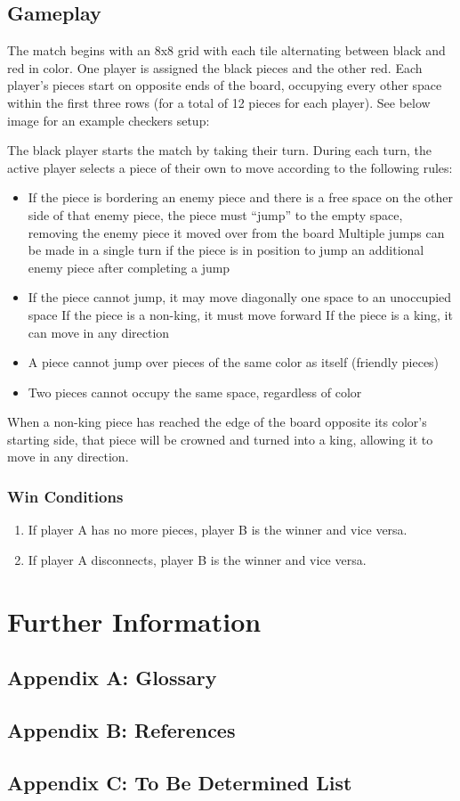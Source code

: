 \documentclass{scrreprt}
\begin{document}
\section{Gameplay}

The match begins with an 8x8 grid with each tile alternating between black and red in color.
One player is assigned the black pieces and the other red.
Each player’s pieces start on opposite ends of the board, occupying every other space within the first three rows (for a total of 12 pieces for each player).
See below image for an example checkers setup:


The black player starts the match by taking their turn.
During each turn, the active player selects a piece of their own to move according to the following rules:

\begin{itemize}
    \item If the piece is bordering an enemy piece and there is a free space on the other side of that enemy piece, the piece must “jump” to the empty space, removing the enemy piece it moved over from the board
        \subitem Multiple jumps can be made in a single turn if the piece is in position to jump an additional enemy piece after completing a jump
    \item If the piece cannot jump, it may move diagonally one space to an unoccupied space
        \subitem If the piece is a non-king, it must move forward
        \subitem If the piece is a king, it can move in any direction
    \item A piece cannot jump over pieces of the same color as itself (friendly pieces)
    \item Two pieces cannot occupy the same space, regardless of color
\end{itemize}

When a non-king piece has reached the edge of the board opposite its color’s starting side, that piece will be crowned and turned into a king, allowing it to move in any direction.
\subsection{Win Conditions}

\begin{enumerate}
    \item If player A has no more pieces, player B is the winner and vice versa.
    \item If player A disconnects, player B is the winner and vice versa.
\end{enumerate}

\chapter{Further Information}

\section{Appendix A: Glossary}

\section{Appendix B: References}

\section{Appendix C: To Be Determined List}
\end{document}
